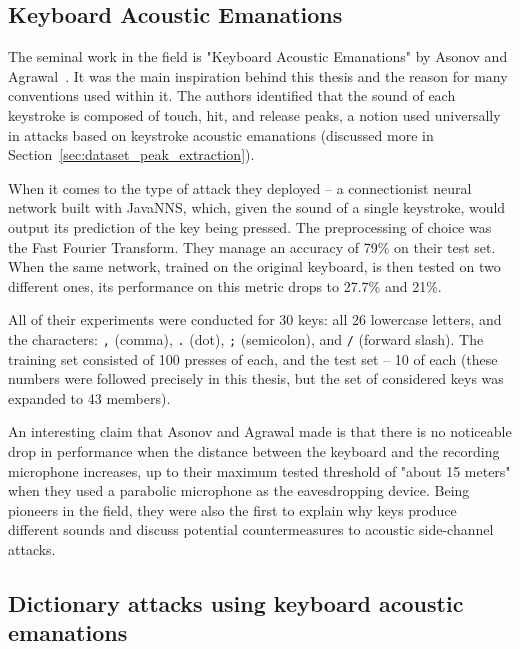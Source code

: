 \documentclass[../main.tex]{subfiles}
\begin{document}
\subsection{Keyboard Acoustic Emanations}
\label{sec:literature_review_keyboard_acoustic_emanations}
The seminal work in the field is "Keyboard Acoustic Emanations" by Asonov and Agrawal~\cite{og2004}. It was the main inspiration behind this thesis and the reason for many conventions used within it. The authors identified that the sound of each keystroke is composed of touch, hit, and release peaks, a notion used universally in attacks based on keystroke acoustic emanations (discussed more in Section~\ref{sec:dataset_peak_extraction}).

When it comes to the type of attack they deployed -- a  connectionist neural network built with JavaNNS, which, given the sound of a single keystroke, would output its prediction of the key being pressed. The preprocessing of choice was the Fast Fourier Transform.
They manage an accuracy of 79\% on their test set. When the same network, trained on the original keyboard, is then tested on two different ones, its performance on this metric drops to 27.7\% and 21\%.

All of their experiments were conducted for 30 keys: all 26 lowercase letters, and the characters: \verb|,| (comma), \verb|.| (dot), \verb|;| (semicolon), and \verb|/| (forward slash). The training set consisted of 100 presses of each, and the test set -- 10 of each (these numbers were followed precisely in this thesis, but the set of considered keys was expanded to 43 members). 

An interesting claim that Asonov and Agrawal made is that there is no noticeable drop in performance when the distance between the keyboard and the recording microphone increases, up to their maximum tested threshold of "about 15 meters" when they used a parabolic microphone as the eavesdropping device.
Being pioneers in the field, they were also the first to explain why keys produce different sounds and discuss potential countermeasures to acoustic side-channel attacks.

\subsection{Dictionary attacks using keyboard acoustic emanations}
\label{sec:dictionary_attacks_using_keyboard_acoustic_emanations}
\end{document}
